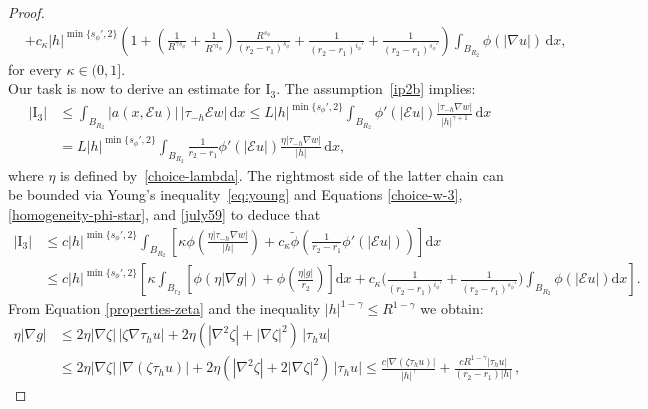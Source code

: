 \documentclass[leqno,11pt]{amsart}%
\numberwithin{equation}{section}
\def\d{\mathrm{d}}
\def\E{\mathcal{E}}
\def\dx{\d x}
\theoremstyle{definition}
\numberwithin{equation}{section}
\begin{document}
\begin{proof}
\begin{align}
      &+
      c_\kappa |h|^{\min\{s_\phi',2\}}\left( 1+{\left(\frac{1}{R^{\gamma s_\phi}}+\frac{1}{R^{\gamma i_\phi}}\right)\frac{R^{s_\phi}}{(r_2-r_1)^{s_\phi}}}
      +
      \frac{1}{(r_2-r_1)^{i_\phi'}}
      +\frac{1}{(r_2-r_1)^{s_\phi'}}
    \right)\int_{B_{R_2}}\phi(|\nabla u|)
      \,\dx,
  \end{align}
  for every $\kappa\in(0,1]$.
  \\
  Our task is now to derive an estimate for $\mathrm{I}_3$.
  The assumption~\eqref{ip2b} implies:
  \begin{align*}
    |\mathrm{I}_3|
    &\le
    \int_{B_{R_2}}|a(x,\E u)|\,|\tau_{-h}\E w|\,\dx\le
    { L}|h|^{\min\{s_\phi',2\}}\int_{B_{R_2}}\phi'(|\E
      u|)\frac{|\tau_{-h}\nabla  w|}{|h|^{\gamma+1}}\,\dx\\
    &=
      L|h|^{\min\{s_\phi',2\}}\int_{B_{R_2}}\frac{1}{r_2-r_1}\phi'(|\E
      u|)\frac{\eta |\tau_{-h}\nabla w|}{|h|}\,\dx,
  \end{align*}
  where $\eta$ is defined by~\eqref{choice-lambda}.
  The rightmost side of the latter chain can be bounded via Young's
  inequality~\eqref{eq:young} and Equations \eqref{choice-w-3},
  \eqref{homogeneity-phi-star},
  and \eqref{july59} to deduce that
  \begin{align}\label{first-est-I3}
    |\mathrm{I}_3|
    &\le
      c|h|^{\min\{s_\phi',2\}}\int_{B_{R_2}}
      \left[\kappa\phi\left(\frac{\eta |\tau_{-h}\nabla w|}{|h|}\right)
      +c_\kappa\widetilde \phi\left(\frac1{r_2-r_1}\phi'(|\E
      u|)\right)\right]\dx\\\nonumber
    &\le
      c|h|^{\min\{s_\phi',2\}}
      \left[\kappa
      \int_{B_{r_2}}\left[\phi\left(\eta|\nabla g|\right)+\phi\left(\frac{\eta|g|}{{r_2}}\right)\right]\dx
       +
       c_\kappa\Bigg(
       \frac{1}{(r_2-r_1)^{i_\phi'}}
      +\frac{1}{(r_2-r_1)^{s_\phi'}}
      \Bigg)\int_{B_{R_2}}
      \phi(|\E u|)\dx\right].
  \end{align}
  From Equation \eqref{properties-zeta} and the inequality $|h|^{1-\gamma}\le R^{1-\gamma}$ we
  obtain:
  \begin{align*}
    \eta |\nabla g|
   & \le
      2\eta |\nabla\zeta|\,|\zeta \nabla \tau_hu|
      +
      2\eta(|\nabla ^2\zeta|+|\nabla\zeta|^2)\,|\tau_hu|\\ \nonumber &\le
      2\eta|\nabla\zeta|\,|\nabla (\zeta\tau_hu)|+2\eta(|\nabla ^2\zeta|+2|\nabla\zeta|^2)\,|\tau_hu| \le
      \frac{c|\nabla (\zeta\tau_hu)|}{|h|^{\gamma}}
      +
      \frac{cR^{1-\gamma}|\tau_hu|}{(r_2-r_1)|h|}\,,
\end{align*}

\end{proof}
\end{document}
